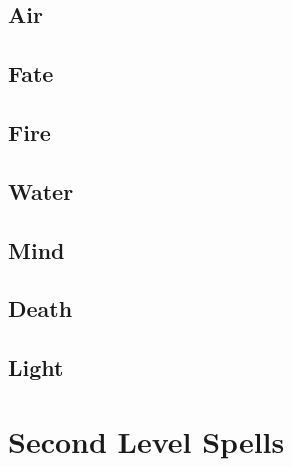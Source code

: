 \begin{multicols}{2}

\subsection{Air}


\subsection{Fate}


\subsection{Fire}


\subsection{Water}


\subsection{Mind}


\subsection{Death}


\subsection{Light}


\end{multicols}

\section{Second Level Spells}

